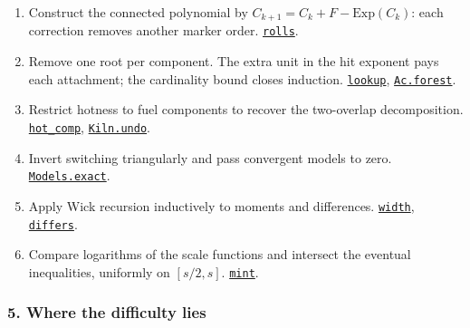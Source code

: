 \documentclass[
  letterpaper,
  11pt]{article}
\begin{document}
\begin{enumerate}
\def\labelenumi{\arabic{enumi}.}
\item
  Construct the connected polynomial by
  \(C_{k+1}=C_k+F-\mathrm{Exp}(C_k)\): each correction removes another
  marker order.
  \href{https://github.com/yang-mills-group/OpenAI-YM-20261028/blob/3456e5e75cf8d4cd558955a5c7638fba2d68f464/YM/Next/RANK/Exponential.lean\#L133-L149}{\texttt{rolls}}.
\item
  Remove one root per component. The extra unit in the hit exponent pays
  each attachment; the cardinality bound closes induction.
  \href{https://github.com/yang-mills-group/OpenAI-YM-20261028/blob/3456e5e75cf8d4cd558955a5c7638fba2d68f464/YM/Ac/Table.lean\#L81-L106}{\texttt{lookup}},
  \href{https://github.com/yang-mills-group/OpenAI-YM-20261028/blob/3456e5e75cf8d4cd558955a5c7638fba2d68f464/YM/Ac/Tree.lean\#L89-L127}{\texttt{Ac.forest}}.
\item
  Restrict hotness to fuel components to recover the two-overlap
  decomposition.
  \href{https://github.com/yang-mills-group/OpenAI-YM-20261028/blob/3456e5e75cf8d4cd558955a5c7638fba2d68f464/YM/Further/SHELL_BIRTH_49/Fusing/Coal.lean\#L149-L162}{\texttt{hot\_comp}},
  \href{https://github.com/yang-mills-group/OpenAI-YM-20261028/blob/3456e5e75cf8d4cd558955a5c7638fba2d68f464/YM/Further/SHELL_BIRTH_49/Fusing/Coal.lean\#L210-L240}{\texttt{Kiln.undo}}.
\item
  Invert switching triangularly and pass convergent models to zero.
  \href{https://github.com/yang-mills-group/OpenAI-YM-20261028/blob/3456e5e75cf8d4cd558955a5c7638fba2d68f464/YM/MergeProof/Switch.lean\#L58-L63}{\texttt{Models.exact}}.
\item
  Apply Wick recursion inductively to moments and differences.
  \href{https://github.com/yang-mills-group/OpenAI-YM-20261028/blob/3456e5e75cf8d4cd558955a5c7638fba2d68f464/YM/Next/RANK/Common.lean\#L121-L123}{\texttt{width}},
  \href{https://github.com/yang-mills-group/OpenAI-YM-20261028/blob/3456e5e75cf8d4cd558955a5c7638fba2d68f464/YM/Next/RANK/Common.lean\#L124-L126}{\texttt{differs}}.
\item
  Compare logarithms of the scale functions and intersect the eventual
  inequalities, uniformly on \([s/2,s]\).
  \href{https://github.com/yang-mills-group/OpenAI-YM-20261028/blob/3456e5e75cf8d4cd558955a5c7638fba2d68f464/YM/Next/RANK/Bird.lean\#L145-L158}{\texttt{mint}}.
\end{enumerate}

\subsubsection{5. Where the difficulty
lies}\label{where-the-difficulty-lies-2}
\end{document}
